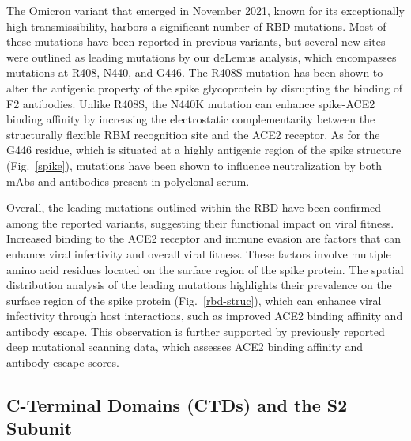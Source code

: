 \documentclass[aps,prl,amsmath,amssymb,floatfix,twocolumn, amsmath, superscriptaddress, onecolumn]{revtex4}
\newcommand{\fref}[1]{Fig.~\ref{#1}}%
\begin{document}
The Omicron variant that emerged in November 2021, known for its exceptionally high transmissibility, harbors a significant number of RBD mutations. Most of these mutations have been reported in previous variants, but several new sites were outlined as leading mutations by our deLemus analysis, which encompasses mutations at R408, N440, and G446. The R408S mutation has been shown to alter the antigenic property of the spike glycoprotein by disrupting the binding of F2 antibodies.\cite{Cao2022} Unlike R408S, the N440K mutation can enhance spike-ACE2 binding affinity by increasing the electrostatic complementarity between the structurally flexible RBM recognition site and the ACE2 receptor.\cite{Gan2021} As for the G446 residue, which is situated at a highly antigenic region of the spike structure (\fref{spike}), mutations have been shown to influence neutralization by both mAbs and antibodies present in polyclonal serum.\cite{li_impact_2020,starr_prospective_2021,Liu2021}

Overall, the leading mutations outlined within the RBD have been confirmed among the reported variants, suggesting their functional impact on viral fitness. Increased binding to the ACE2 receptor and immune evasion are factors that can enhance viral infectivity and overall viral fitness. \cite{Yi2022}
\cite{Mannar2021} These factors involve multiple amino acid residues located on the surface region of the spike protein. The spatial distribution analysis of the leading mutations highlights their prevalence on the surface region of the spike protein (\fref{rbd-struc}), which can enhance viral infectivity through host interactions, such as improved ACE2 binding affinity and antibody escape. This observation is further supported by previously reported deep mutational scanning data, which assesses ACE2 binding affinity and antibody escape scores.\cite{starr_deep_2020} 

\subsection{C-Terminal Domains (CTDs) and the S2 Subunit}
\end{document}
